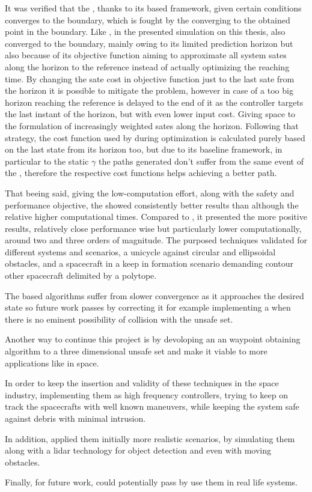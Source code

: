 It was verified that the , thanks to its based framework, given certain conditions converges to the boundary, which is fought by the  converging to the obtained point in the boundary. Like , in the presented simulation on this thesis,  also converged to the boundary, mainly owing to its limited prediction horizon but also because of its objective function aiming to approximate all system sates along the horizon to the reference instead of actually optimizing the reaching time. By changing the sate cost in objective function just to the last sate from the horizon it is possible to mitigate the problem, however in case of a too big horizon reaching the reference is delayed to the end of it as the controller targets the last instant of the horizon, but with even lower input cost. Giving space to the formulation of increasingly weighted sates along the horizon. Following that strategy, the cost function used by  during optimization is calculated purely based on the last state from its horizon too, but due to its baseline framework, in particular to the static \(\gamma\) the paths generated don't suffer from the same event of the , therefore the respective cost functions helps achieving a better path.       

That beeing said, giving the low-computation effort, along with the safety and performance objective, the  showed consistently better results than  although the relative higher computational times. Compared to , it presented the more positive results, relatively close performance wise but particularly lower computationally, around two and three orders of magnitude. The purposed techniques validated for different systems and scenarios, a unicycle against circular and ellipsoidal obstacles, and a spacecraft in a keep in formation scenario demanding contour other spacecraft delimited by a polytope.  

The  based algorithms suffer from slower convergence as it approaches the desired state so future work passes by correcting it for example implementing a  when there is no eminent possibility of collision with the unsafe set. 

Another way to continue this project is by devoloping an an waypoint obtaining algorithm to a three dimensional unsafe set and make it viable to more applications like in space. 

In order to keep the insertion and validity of these techniques in the space industry, implementing them as high frequency controllers, trying to keep on track the spacecrafts with well known maneuvers, while keeping the system safe against debris with minimal intrusion.  

In addition, applied them initially more realistic scenarios, by simulating them along with a lidar technology for object detection and even with moving obstacles.

Finally, for future work, could potentially pass by use them in real life systems. 